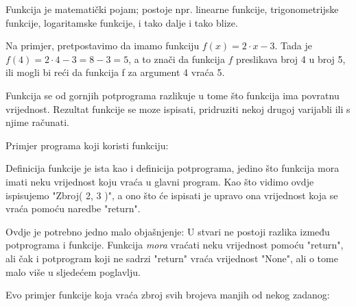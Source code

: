Funkcija je matematički pojam; postoje npr. linearne funkcije,
trigonometrijske funkcije, logaritamske funkcije, i tako dalje i
tako blize.

Na primjer, pretpostavimo da imamo funkciju $f(x)=2\cdot x-3$. Tada
je $f(4)=2\cdot 4-3=8-3=5$, a to znači da funkcija $f$ preslikava
broj 4 u broj 5, ili mogli bi reći da funkcija f za argument
4 vraća 5.

Funkcija se od gornjih potprograma razlikuje u tome što funkcija
ima povratnu vrijednost. Rezultat funkcije se moze ispisati,
pridruziti nekoj drugoj varijabli ili s njime računati. 

Primjer programa koji koristi funkciju:


Definicija funkcije je ista kao i definicija potprograma, jedino što
funkcija mora imati neku vrijednost koju vraća u glavni program. Kao
što vidimo ovdje ispisujemo "Zbroj( 2, 3 )", a ono što će
ispisati je upravo ona vrijednost koja se vraća pomoću naredbe
"return".

Ovdje je potrebno jedno malo objašnjenje: U stvari ne postoji razlika
između potprograma i funkcije. Funkcija \emph{mora} vraćati neku
vrijednost pomoću "return", ali čak i potprogram koji ne sadrzi
"return" vraća vrijednost "None", ali o tome malo više u
sljedećem poglavlju.

Evo primjer funkcije koja vraća zbroj svih brojeva manjih od nekog
zadanog:


